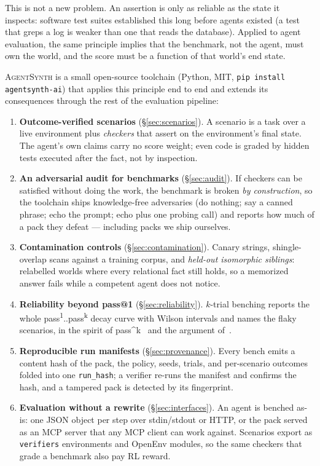 \documentclass[11pt]{article}
\newcommand{\agentsynth}{\textsc{AgentSynth}}
\begin{document}
This is not a new problem. An assertion is only as reliable as the state it
inspects: software test suites established this long before agents existed
(a test that greps a log is weaker than one that reads the database). Applied
to agent evaluation, the same principle implies that the benchmark, not the
agent, must own the world, and the score must be a function of that world's
end state.

\agentsynth{} is a small open-source toolchain (Python, MIT,
\texttt{pip install agentsynth-ai}) that applies this principle end to end and
extends its consequences through the rest of the evaluation pipeline:

\begin{enumerate}
  \item \textbf{Outcome-verified scenarios} (\S\ref{sec:scenarios}). A scenario
  is a task over a live environment plus \emph{checkers} that assert on the
  environment's final state. The agent's own claims carry no score weight; even
  code is graded by hidden tests executed after the fact, not by inspection.
  \item \textbf{An adversarial audit for benchmarks}
  (\S\ref{sec:audit}). If checkers can be satisfied without doing the work, the
  benchmark is broken \emph{by construction}, so the toolchain ships
  knowledge-free adversaries (do nothing; say a canned phrase; echo the prompt;
  echo plus one probing call) and reports how much of a pack they defeat ---
  including packs we ship ourselves.
  \item \textbf{Contamination controls} (\S\ref{sec:contamination}). Canary
  strings, shingle-overlap scans against a training corpus, and \emph{held-out
  isomorphic siblings}: relabelled worlds where every relational fact still
  holds, so a memorized answer fails while a competent agent does not notice.
  \item \textbf{Reliability beyond pass@1} (\S\ref{sec:reliability}).
  $k$-trial benching reports the whole
  pass\textsuperscript{1}..pass\textsuperscript{k} decay curve with Wilson
  intervals and names the flaky scenarios, in the spirit of
  pass\^{}k~\cite{yao2024tau} and the argument of~\cite{beyondpass1}.
  \item \textbf{Reproducible run manifests} (\S\ref{sec:provenance}). Every
  bench emits a content hash of the pack, the policy, seeds, trials, and
  per-scenario outcomes folded into one \texttt{run\_hash}; a verifier re-runs
  the manifest and confirms the hash, and a tampered pack is detected by its
  fingerprint.
  \item \textbf{Evaluation without a rewrite} (\S\ref{sec:interfaces}). An
  agent is benched as-is: one JSON object per step over stdin/stdout or HTTP,
  or the pack served as an MCP server that any MCP client can work against.
  Scenarios export as \texttt{verifiers} environments and OpenEnv modules, so
  the same checkers that grade a benchmark also pay RL reward.
\end{enumerate}
\end{document}
